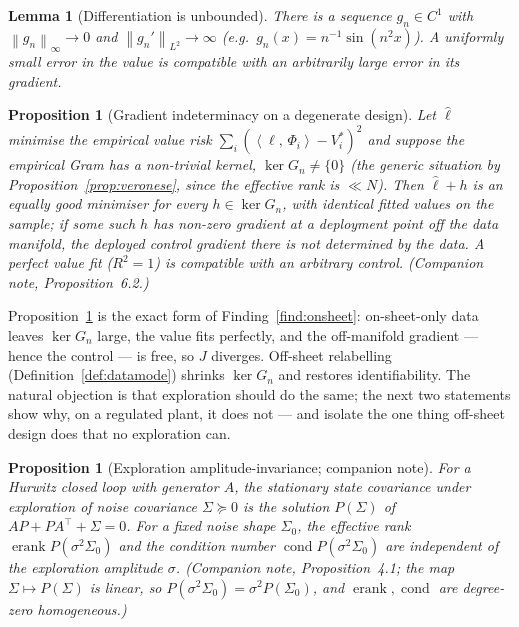 \documentclass[11pt]{article}
\renewcommand{\_}{\discretionary{\textunderscore}{}{\textunderscore}}
\theoremstyle{plain}
\newtheorem{proposition}[theorem]{Proposition}
\newtheorem{lemma}[theorem]{Lemma}
\theoremstyle{definition}
\newcommand{\effrank}{\operatorname{erank}}
\newcommand{\cond}{\operatorname{cond}}
\newcommand{\norm}[1]{\left\lVert #1 \right\rVert}
\newcommand{\inner}[2]{\left\langle #1,\, #2 \right\rangle}
\begin{document}
\begin{lemma}[Differentiation is unbounded]\label{lem:diff}
There is a sequence $g_{n}\in C^{1}$ with $\norm{g_{n}}_{\infty}\to0$ and
$\norm{g_{n}'}_{L^{2}}\to\infty$ (e.g.\ $g_{n}(x)=n^{-1}\sin(n^{2}x)$). A uniformly small error
in the value is compatible with an arbitrarily large error in its gradient.
\end{lemma}

\begin{proposition}[Gradient indeterminacy on a degenerate design]\label{prop:kerG}
Let $\hat\ell$ minimise the empirical value risk $\sum_i(\inner{\ell}{\Phi_i}-V^{\ast}_i)^{2}$ and
suppose the empirical Gram has a non-trivial kernel, $\ker G_{n}\ne\{0\}$ (the generic situation
by Proposition~\ref{prop:veronese}, since the effective rank is $\ll N$). Then $\hat\ell+h$ is
an equally good minimiser for every $h\in\ker G_{n}$, with identical fitted values on the
sample; if some such $h$ has non-zero gradient at a deployment point off the data manifold, the
deployed control gradient there is \emph{not determined by the data}. A perfect value fit
($R^{2}=1$) is compatible with an arbitrary control. (Companion note, Proposition~6.2.)
\end{proposition}

Proposition~\ref{prop:kerG} is the exact form of Finding~\ref{find:onsheet}: on-sheet-only data
leaves $\ker G_{n}$ large, the value fits perfectly, and the off-manifold gradient --- hence the
control --- is free, so $J$ diverges. Off-sheet relabelling (Definition~\ref{def:datamode})
shrinks $\ker G_{n}$ and restores identifiability. The natural objection is that exploration should
do the same; the next two statements show why, on a regulated plant, it does not --- and isolate the
one thing off-sheet design does that no exploration can.

\begin{proposition}[Exploration amplitude-invariance; companion note]\label{prop:lyapunov}
For a Hurwitz closed loop with generator $A$, the stationary state covariance under exploration of
noise covariance $\Sigma\succeq0$ is the solution $P(\Sigma)$ of $AP+PA^{\top}+\Sigma=0$. For a fixed
noise shape $\Sigma_{0}$, the effective rank $\effrank P(\sigma^{2}\Sigma_{0})$ and the condition
number $\cond P(\sigma^{2}\Sigma_{0})$ are independent of the exploration amplitude $\sigma$.
(Companion note, Proposition~4.1; the map $\Sigma\mapsto P(\Sigma)$ is linear, so
$P(\sigma^{2}\Sigma_{0})=\sigma^{2}P(\Sigma_{0})$, and $\effrank,\cond$ are degree-zero homogeneous.)
\end{proposition}
\end{document}
